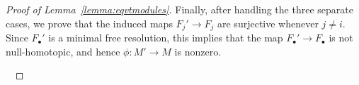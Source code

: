 \documentclass[12pt]{amsart}
\theoremstyle{definition}
\newcommand{\Sc}{\mathbf{S}}
\newcommand{\Sym}{\operatorname{Sym}}
\begin{document}
\begin{proof}[Proof of Lemma~\ref{lemma:eqvtmodules}]
Finally, after handling the three separate cases, we prove that the induced maps 
$F_j'\to F_j$ are surjective whenever $j\ne i$.  Since $F_\bullet'$ is a minimal
free resolution, this implies that the map $F_\bullet'\to F_\bullet$ is not null-homotopic,
and hence $\phi \colon M'\to M$ is nonzero.


  ~


\end{proof}
\end{document}
